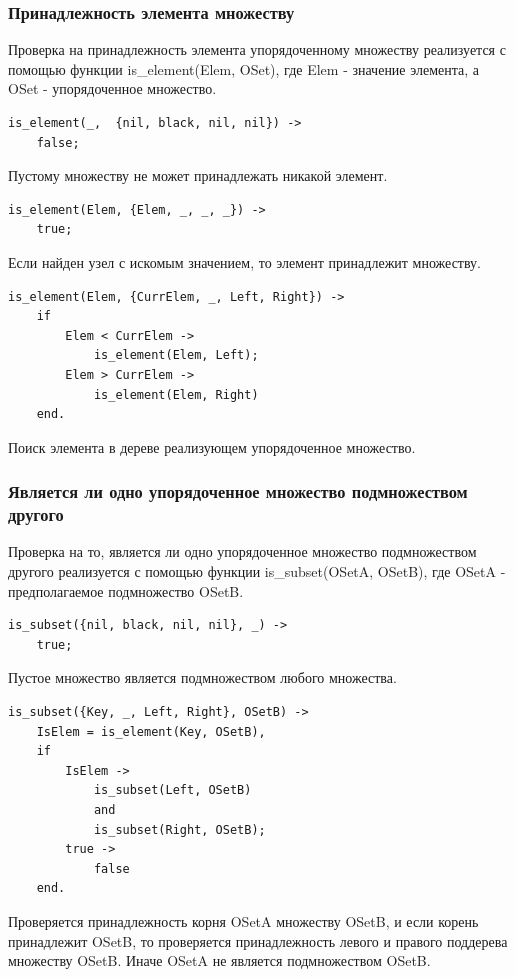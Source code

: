		\subsubsection{Принадлежность элемента множеству}
			Проверка на принадлежность элемента упорядоченному множеству
			реализуется с помощью функции is\_element(Elem, OSet), где Elem - 
			значение элемента, а OSet - упорядоченное множество.
			\begin{lstlisting}
is_element(_,  {nil, black, nil, nil}) ->
    false;				
			\end{lstlisting}
			Пустому множеству не может принадлежать никакой элемент.
			\begin{lstlisting}
is_element(Elem, {Elem, _, _, _}) ->
    true;
			\end{lstlisting}
			Если найден узел с искомым значением, то элемент принадлежит множеству.
			\begin{lstlisting}
is_element(Elem, {CurrElem, _, Left, Right}) ->		
    if
        Elem < CurrElem -> 
            is_element(Elem, Left);
        Elem > CurrElem -> 
            is_element(Elem, Right)
    end.	
			\end{lstlisting}
			Поиск элемента в дереве реализующем упорядоченное множество.
			
		\subsubsection{Является ли одно упорядоченное множество подмножеством другого}
			Проверка на то, является ли одно упорядоченное множество подмножеством другого
			реализуется с помощью функции is\_subset(OSetA, OSetB), где OSetA - предполагаемое
			подмножество OSetB.
			\begin{lstlisting}
is_subset({nil, black, nil, nil}, _) ->
    true;	
			\end{lstlisting}
			Пустое множество является подмножеством любого множества.	
			\begin{lstlisting}
is_subset({Key, _, Left, Right}, OSetB) ->
    IsElem = is_element(Key, OSetB),
    if
        IsElem -> 
            is_subset(Left, OSetB) 
            and 
            is_subset(Right, OSetB);
        true -> 
            false
    end.
			\end{lstlisting}
			Проверяется принадлежность корня OSetA множеству OSetB, и если корень
			принадлежит OSetB, то проверяется принадлежность левого и правого поддерева
			множеству OSetB. Иначе OSetA не является подмножеством OSetB.
			
